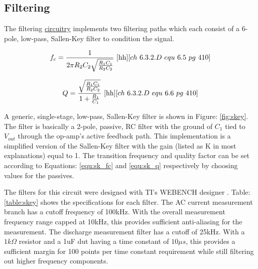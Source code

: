 \subsection{Filtering}
\label{sec:filtering}
\nocite{kirk_skey}

The filtering \hyperlink{sch:filtering}{circuitry} implements two filtering paths which each consist of a 6-pole, low-pass, Sallen-Key filter to condition the signal.



\begin{equation}
    \label{equ:sk_fc}
    f_c = \frac{1}{2\pi R_2C_2\sqrt{\frac{R_1C_1}{R_2C_2}}}
    ~\cite{hh}[ch~6.3.2.D~equ~6.5~pg~410]
\end{equation}

\begin{equation}
    \label{equ:sk_q}
    Q = \frac{\sqrt{\frac{R_1C_1}{R_2C_2}}}{1 + \frac{R_1}{C_1}}
    ~\cite{hh}[ch~6.3.2.D~equ~6.6~pg~410]
\end{equation}

A generic, single-stage, low-pass, Sallen-Key filter is shown in Figure: \ref{fig:skey}. The filter is basically a 2-pole, passive, RC filter with the ground of $C_1$ tied to $V_{out}$ through the op-amp's active feedback path. This implementation is a simplified version of the Sallen-Key filter with the gain (listed as K in most explanations) equal to 1. The transition frequency and quality factor can be set according to Equations: \eqref{equ:sk_fc} and \eqref{equ:sk_q} respectively by choosing values for the passives.



The filters for this circuit were designed with TI's WEBENCH designer \cite{webench}. Table: \ref{table:skey} shows the specifications for each filter. 
The AC current measurement branch has a cutoff frequency of 100kHz. With the overall measurement frequency range capped at 10kHz, this provides sufficient anti-aliasing for the measurement. The discharge measurement filter has a cutoff of 25kHz. With a $1k\Omega$ resistor and a 1uF \gls{dut} having a time constant of $10\mu s$, this provides a sufficient margin for 100 points per time constant requirement while still filtering out higher frequency components.


